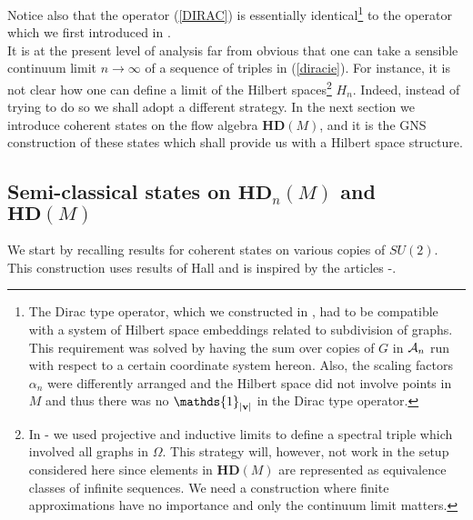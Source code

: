 \documentclass[12pt]{article}
\def\a{\alpha}
\def\OO{\Omega}
\def\ca{{\cal A}}
\begin{document}
Notice also that the operator (\ref{DIRAC}) is essentially identical\footnote{The Dirac type operator, which we constructed in \cite{AGN3}, had to be compatible with a system of Hilbert space embeddings related to subdivision of graphs. This requirement was solved by having the sum over copies of $G$ in $\ca_n$ run with respect to a certain coordinate system hereon. Also, the scaling factors $\a_n$ were differently arranged and the Hilbert space did not involve points in $M$ and thus there was no $\mathds{1}_{\vert {\bf v}  \vert } $ in the Dirac type operator.} to the operator which we first introduced in \cite{AGN3}.\\



It is at the present level of analysis far from obvious that one can take a sensible continuum limit $n\rightarrow\infty$ of a sequence of triples in (\ref{diracie}). For instance, it is not clear how one can define a limit of the Hilbert spaces\footnote{In \cite{AGN1}-\cite{AGN3} we used projective and inductive limits to define a spectral triple which involved all graphs in $\OO$. This strategy will, however, not work in the setup considered here since elements in $\mathbf{HD}(M)$ are represented as equivalence classes of infinite sequences. We need a construction where finite approximations have no importance and only the continuum limit matters. } $H_n$. Indeed, instead of trying to do so we shall adopt a different strategy. In the next section we introduce coherent states on the flow algebra $\mathbf{HD}(M) $, and it is the GNS construction of these states which shall provide us with a Hilbert space structure.







\subsection{Semi-classical states on $\mathbf{HD}_n(M) $ and $\mathbf{HD}(M) $}





We start by recalling results for coherent states on various copies of $SU(2)$. This construction uses results of Hall \cite{H1,H2} and is inspired by the articles \cite{BT1}-\cite{BT2}.
\end{document}
